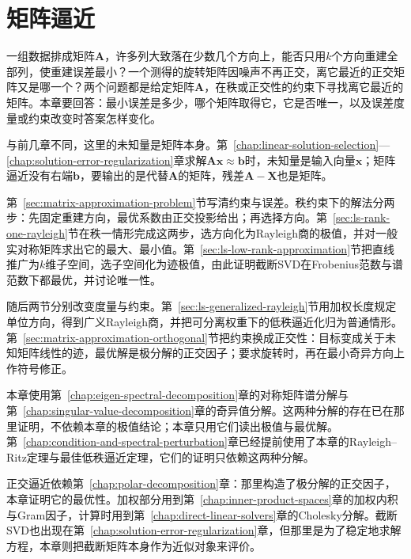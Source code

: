 \chapter{矩阵逼近}
\label{chap:matrix-approximation}

一组数据排成矩阵$\bm A$，许多列大致落在少数几个方向上，能否只用$k$个方向重建全部列，使重建误差最小？一个测得的旋转矩阵因噪声不再正交，离它最近的正交矩阵又是哪一个？两个问题都是给定矩阵$\bm A$，在秩或正交性的约束下寻找离它最近的矩阵。本章要回答：最小误差是多少，哪个矩阵取得它，它是否唯一，以及误差度量或约束改变时答案怎样变化。

与前几章不同，这里的未知量是矩阵本身。第~\ref{chap:linear-solution-selection}—\ref{chap:solution-error-regularization}章求解$\bm A\bm x\approx\bm b$时，未知量是输入向量$\bm x$；矩阵逼近没有右端$\bm b$，要输出的是代替$\bm A$的矩阵，残差$\bm A-\bm X$也是矩阵。

第~\ref{sec:matrix-approximation-problem}节写清约束与误差。秩约束下的解法分两步：先固定重建方向，最优系数由正交投影给出；再选择方向。第~\ref{sec:ls-rank-one-rayleigh}节在秩一情形完成这两步，选方向化为Rayleigh商的极值，并对一般实对称矩阵求出它的最大、最小值。第~\ref{sec:ls-low-rank-approximation}节把直线推广为$k$维子空间，选子空间化为迹极值，由此证明截断SVD在Frobenius范数与谱范数下都最优，并讨论唯一性。

随后两节分别改变度量与约束。第~\ref{sec:ls-generalized-rayleigh}节用加权长度规定单位方向，得到广义Rayleigh商，并把可分离权重下的低秩逼近化归为普通情形。第~\ref{sec:matrix-approximation-orthogonal}节把约束换成正交性：目标变成关于未知矩阵线性的迹，最优解是极分解的正交因子；要求旋转时，再在最小奇异方向上作符号修正。

本章使用第~\ref{chap:eigen-spectral-decomposition}章的对称矩阵谱分解与第~\ref{chap:singular-value-decomposition}章的奇异值分解。这两种分解的存在已在那里证明，不依赖本章的极值结论；本章只用它们读出极值与最优解。第~\ref{chap:condition-and-spectral-perturbation}章已经提前使用了本章的Rayleigh--Ritz定理与最佳低秩逼近定理，它们的证明只依赖这两种分解。

正交逼近依赖第~\ref{chap:polar-decomposition}章：那里构造了极分解的正交因子，本章证明它的最优性。加权部分用到第~\ref{chap:inner-product-spaces}章的加权内积与Gram因子，计算时用到第~\ref{chap:direct-linear-solvers}章的Cholesky分解。截断SVD也出现在第~\ref{chap:solution-error-regularization}章，但那里是为了稳定地求解方程，本章则把截断矩阵本身作为近似对象来评价。






